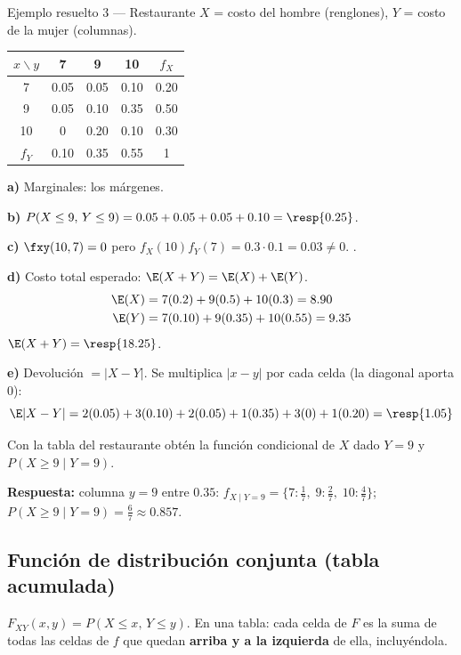 \begin{ejemplo}{Ejemplo resuelto 3 --- Restaurante }
$X$ = costo del hombre (renglones), $Y$ = costo de la mujer (columnas).
\begin{center}
\begin{tabular}{c|ccc|c}
$x\backslash y$ & 7 & 9 & 10 & $f_X$\\ \hline
7 & 0.05 & 0.05 & 0.10 & 0.20\\
9 & 0.05 & 0.10 & 0.35 & 0.50\\
10 & 0 & 0.20 & 0.10 & 0.30\\ \hline
$f_Y$ & 0.10 & 0.35 & 0.55 & 1
\end{tabular}
\end{center}
\textbf{a)} Marginales: los m\'argenes.

\textbf{b)} $P(X\le9,\,Y\le9)=0.05+0.05+0.05+0.10=\resp{0.25}$.

\textbf{c)} $\fxy(10,7)=0$ pero $f_X(10)f_Y(7)=0.3\cdot0.1=0.03\neq0$. .

\textbf{d)} Costo total esperado: $\E(X+Y)=\E(X)+\E(Y)$.
\begin{align*}
\E(X)&=7(0.2)+9(0.5)+10(0.3)=8.90\\
\E(Y)&=7(0.10)+9(0.35)+10(0.55)=9.35
\end{align*}
$\E(X+Y)=\resp{18.25}$.

\textbf{e)} Devoluci\'on $=|X-Y|$. Se multiplica $|x-y|$ por cada celda (la diagonal aporta 0):
\[
\E|X-Y|=2(0.05)+3(0.10)+2(0.05)+1(0.35)+3(0)+1(0.20)=\resp{1.05}
\]
\end{ejemplo}

\begin{mecaniza}
Con la tabla del restaurante obt\'en la funci\'on condicional de $X$ dado $Y=9$ y $P(X\ge 9\mid Y=9)$.

\textbf{Respuesta:} columna $y=9$ entre $0.35$: $f_{X\mid Y=9}=\{7\!:\tfrac17,\;9\!:\tfrac27,\;10\!:\tfrac47\}$;
$P(X\ge9\mid Y=9)=\tfrac67\approx0.857$.
\end{mecaniza}

\subsection{Funci\'on de distribuci\'on conjunta (tabla acumulada)}

$F_{XY}(x,y)=P(X\le x,\,Y\le y)$. En una tabla: cada celda de $F$ es la suma de todas las celdas de $f$ que quedan
\textbf{arriba y a la izquierda} de ella, incluy\'endola.

